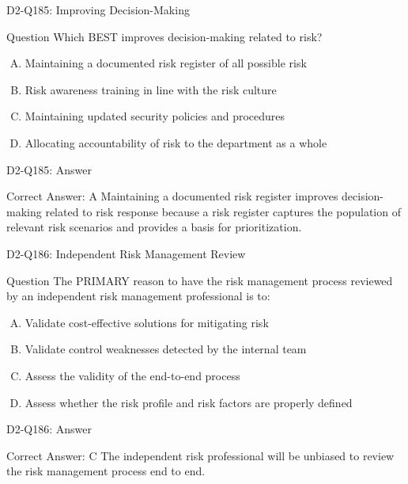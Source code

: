 \documentclass{beamer}
\begin{document}
	\begin{frame}{D2-Q185: Improving Decision-Making}
		\begin{block}{Question}
			Which BEST improves decision-making related to risk?
		\end{block}
		\begin{enumerate}[(A)]
			\item Maintaining a documented risk register of all possible risk
			\item Risk awareness training in line with the risk culture
			\item Maintaining updated security policies and procedures
			\item Allocating accountability of risk to the department as a whole
		\end{enumerate}
	\end{frame}
	\begin{frame}{D2-Q185: Answer}
		\begin{block}{Correct Answer: A}
			Maintaining a documented risk register improves decision-making related to risk response because a risk register captures the population of relevant risk scenarios and provides a basis for prioritization.
		\end{block}
	\end{frame}
	
	\begin{frame}{D2-Q186: Independent Risk Management Review}
		\begin{block}{Question}
			The PRIMARY reason to have the risk management process reviewed by an independent risk management professional is to:
		\end{block}
		\begin{enumerate}[(A)]
			\item Validate cost-effective solutions for mitigating risk
			\item Validate control weaknesses detected by the internal team
			\item Assess the validity of the end-to-end process
			\item Assess whether the risk profile and risk factors are properly defined
		\end{enumerate}
	\end{frame}
	\begin{frame}{D2-Q186: Answer}
		\begin{block}{Correct Answer: C}
			The independent risk professional will be unbiased to review the risk management process end to end.
		\end{block}
	\end{frame}
	
\end{document}
